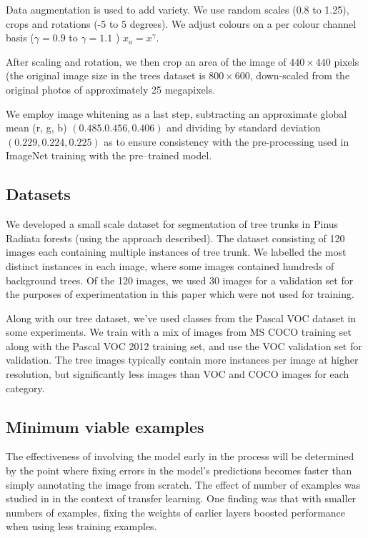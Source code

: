 \documentclass{IEEEtran}
\begin{document}
Data augmentation is used to add variety. We use random scales (0.8 to 1.25), crops and rotations (-5 to 5 degrees). We adjust colours on a per colour channel basis ($ \gamma = 0.9 $ to $ \gamma=1.1 $ )  $ x_a = x^{\gamma} $.

After scaling and rotation, we then crop an area of the image of $440 \times 440$ pixels (the original image size in the trees dataset is $800 \times 600$, down-scaled from the original photos of approximately 25 megapixels.

We employ image whitening as a last step, subtracting an approximate global mean (r, g, b) $ (0.485. 0.456, 0.406) $ and dividing by standard deviation $ (0.229, 0.224, 0.225) $ as to ensure consistency with the pre-processing used in ImageNet training with the pre--trained model.



\subsection {Datasets}




We developed a small scale dataset for segmentation of tree trunks in Pinus Radiata forests (using the approach described). The dataset consisting of 120 images each containing multiple instances of tree trunk. We labelled the most distinct instances in each image, where some images contained hundreds of background trees. Of the 120 images, we used 30 images for a validation set for the purposes of experimentation in this paper which were not used for training.

Along with our tree dataset, we've used classes from the Pascal VOC dataset in some experiments. We train with a mix of images from MS COCO \cite{Lin2014} training set along with the Pascal VOC 2012 training set, and use the VOC validation set for validation. The tree images typically contain more instances per image at higher resolution, but significantly less images than VOC and COCO images for each category.


\subsection {Minimum viable examples}

The effectiveness of involving the model early in the process will be determined by the point where fixing errors in the model's predictions becomes faster than simply annotating the image from scratch. The effect of number of examples was studied in \cite{Soekhoe} in the context of transfer learning. One finding was that with smaller numbers of examples, fixing the weights of earlier layers boosted performance when using less training examples.
\end{document}
